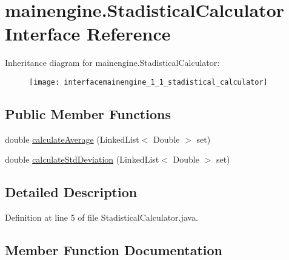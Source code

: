 \hypertarget{interfacemainengine_1_1_stadistical_calculator}{}\section{mainengine.\+Stadistical\+Calculator Interface Reference}
\label{interfacemainengine_1_1_stadistical_calculator}
Inheritance diagram for mainengine.\+Stadistical\+Calculator\+:\begin{figure}[H]
\begin{center}
\leavevmode
\texttt{[image: interfacemainengine\_1\_1\_stadistical\_calculator]}
\end{center}
\end{figure}
\subsection*{Public Member Functions}
\begin{DoxyCompactItemize}
\item 
double \hyperlink{interfacemainengine_1_1_stadistical_calculator_abf970c09783d3f60e597256a97b936db}{calculate\+Average} (Linked\+List$<$ Double $>$ set)
\item 
double \hyperlink{interfacemainengine_1_1_stadistical_calculator_a48e42fd096a3f1e8a0740355ddc104c3}{calculate\+Std\+Deviation} (Linked\+List$<$ Double $>$ set)
\end{DoxyCompactItemize}


\subsection{Detailed Description}


Definition at line 5 of file Stadistical\+Calculator.\+java.



\subsection{Member Function Documentation}
\hypertarget{interfacemainengine_1_1_stadistical_calculator_abf970c09783d3f60e597256a97b936db}{}\label{interfacemainengine_1_1_stadistical_calculator_abf970c09783d3f60e597256a97b936db} 
